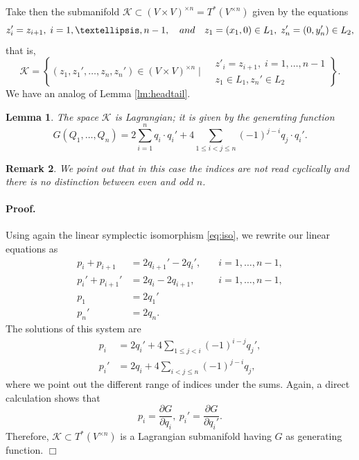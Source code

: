 \documentclass[12pt]{article}
\newtheorem{lemma}{Lemma}[section]
\newtheorem{remark}[lemma]{Remark}
\newcommand{\proofend}{$\Box$\bigskip}
\def\proof{\paragraph{Proof.}}
\begin{document}
Take then the submanifold  $\mathscr{K} \subset (V\times V)^{\times n}=T^* (V^{\times n})$ given by the equations
$$
z_i'=z_{i+1},\; i=1,\ldots,n-1,\quad {\rm and}\quad z_1=(x_1,0)\in L_1,\; z_n'=(0,y_n')\in L_2,
$$
that is,
\begin{equation}\nonumber
\mathscr{K}=\left\{(z_1,z_1',\ldots,z_n,z_n')\in (V\times V)^{\times n}\; \bigg| \; 
\begin{aligned}
& z'_i = z_{i+1},\; i=1,\ldots,n-1\\ 
& z_1\in L_1, z_n'\in L_2
\end{aligned}
\right\}.
\end{equation}
We have an analog of Lemma \ref{lm:headtail}.

\begin{lemma} \label{lm:bdry}
The space $\mathscr{K}$ is Lagrangian; it is given by the generating function
\begin{equation} \label{eq:genfun1}
G(Q_1,\ldots,Q_n) = 2 \sum_{i=1}^n q_i \cdot q_i'+ 4 \sum_{1\le i < j \le n} (-1)^{j-i} q_j \cdot q_i'.
\end{equation}
\end{lemma}

\begin{remark}
{\rm
We point out that in this case the indices are not read cyclically and there is no distinction between even and odd $n$.
}
\end{remark}


\proof
Using again the linear symplectic isomorphism \eqref{eq:iso}, we rewrite our linear equations as
\begin{equation}\nonumber%
\begin{aligned}
p_i+p_{i+1}&=2q_{i+1}'-2q_i', \quad &i=1,\ldots,n-1,\\ 
p_i'+p_{i+1}'&=2q_i - 2q_{i+1}, \quad &i=1,\ldots,n-1,\\[.5ex]
 p_1&=2q_1'\\
  p_n'&=2q_n.
\end{aligned}
\end{equation}
The solutions of this system are
\begin{equation}\nonumber
\begin{aligned}
p_i &= 2q_i' + 4 \sum_{1\le j<i} (-1)^{i-j} q_j',\\[.5ex]
p_i' &=2q_i + 4 \sum_{i<j\le n} (-1)^{j-i} q_j,
\end{aligned}
\end{equation}
where we point out the different range of indices under the sums. Again, a direct calculation shows that
$$
p_i=\frac{\partial G}{\partial q_i},\ p_i'=\frac{\partial G}{\partial q_i'}.
$$
Therefore, $\mathscr{K} \subset T^* (V^{\times n})$ is a Lagrangian submanifold having $G$ as  generating function.
\proofend
\end{document}

